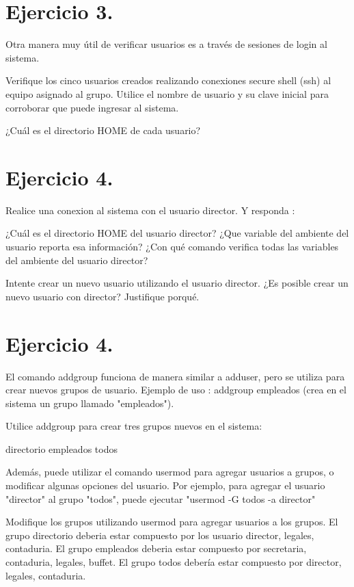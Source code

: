 \documentclass[12pt]{article}
\begin{document}
\section{Ejercicio 3.}
Otra manera muy útil de verificar usuarios es a través de sesiones de login al sistema.

Verifique los cinco usuarios creados realizando conexiones secure shell (ssh) al equipo asignado al grupo.
Utilice el nombre de usuario y su clave inicial para corroborar que puede ingresar al sistema.

¿Cuál es el directorio HOME de cada usuario?



\section{Ejercicio 4.}
Realice una conexion al sistema con el usuario director.
Y responda :

¿Cuál es el directorio HOME del usuario director? ¿Que variable del ambiente del usuario reporta esa información?
¿Con qué comando verifica todas las variables del ambiente del usuario director?

Intente crear un nuevo usuario utilizando el usuario director.
¿Es posible crear un nuevo usuario con director? Justifique porqué.



\section{Ejercicio 4.}
El comando addgroup funciona de manera similar a adduser, pero se utiliza para crear nuevos grupos de usuario.
Ejemplo de uso : addgroup empleados (crea en el sistema un grupo llamado "empleados").


Utilice addgroup para crear tres grupos nuevos en el sistema:

\begin{itemize}
\itme directorio
\itme empleados
\itme todos
\end{itemize}

Además, puede utilizar el comando usermod para agregar usuarios a grupos, o modificar algunas opciones del usuario.
Por ejemplo, para agregar el usuario "director" al grupo "todos", puede ejecutar "usermod -G todos -a director"

Modifique los grupos utilizando usermod para agregar usuarios a los grupos. 
El grupo directorio deberia estar compuesto por los usuario director, legales, contaduria.
El grupo empleados deberia estar compuesto por secretaria, contaduria, legales, buffet.
El grupo todos debería estar compuesto por director, legales, contaduria.
\end{document}
